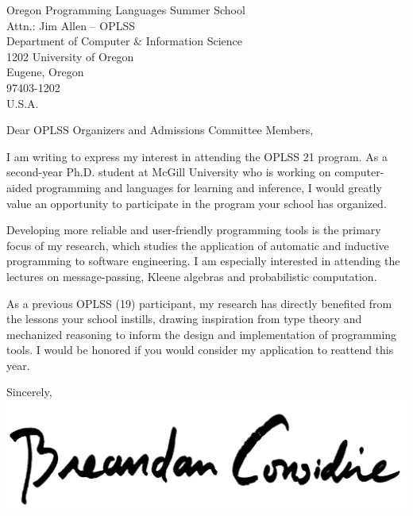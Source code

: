 \documentclass{letter}
\begin{document}
  \begin{letter}{Oregon Programming Languages Summer School\\Attn.: Jim Allen -- OPLSS\\Department of Computer \& Information Science\\1202 University of Oregon\\Eugene, Oregon\\97403-1202\\U.S.A.}
    \opening{Dear OPLSS Organizers and Admissions Committee Members,}
    I am writing to express my interest in attending the OPLSS \textsc{}21 program. As a second-year Ph.D. student at McGill University who is working on computer-aided programming and languages for learning and inference, I would greatly value an opportunity to participate in the program your school has organized.

    Developing more reliable and user-friendly programming tools is the primary focus of my research, which studies the application of automatic and inductive programming to software engineering. I am especially interested in attending the lectures on message-passing, Kleene algebras and probabilistic computation.

    As a previous  OPLSS (\textsc{}19) participant, my research has directly benefited from the lessons your school instills, drawing inspiration from type theory and mechanized reasoning to inform the design and implementation of programming tools. I would be honored if you would consider my application to reattend this year.
    \closing{Sincerely,\\
    \includegraphics[scale=0.06]{signature}\\
    }
  \end{letter}
\end{document}
